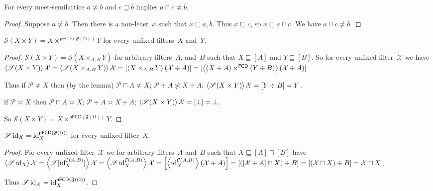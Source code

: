 \begin{lem}
For every meet-semilattice $a\nasymp b$ and
$c\sqsupseteq b$ implies $a\sqcap c\nasymp b$.
\end{lem}

\begin{proof}
Suppose $a\nasymp b$. Then there is a non-least~$x$
such that $x\sqsubseteq a,b$. Thus $x\sqsubseteq c$,
so $x\sqsubseteq a\sqcap c$. We have
$a\sqcap c\nasymp b$.
\end{proof}

\begin{prop}
$\mathscr{S}(X\times Y)
=X\times^{\mathsf{pFCD}(\mathfrak{F}(\mho))}Y$
for every unfixed filters~$X$ and~$Y$.
\end{prop}

\begin{proof}
$\mathscr{S}(X\times Y) = \mathscr{S}(X\times_{A,B}Y)$
for arbitrary filters~$A$, and~$B$ such that
$X\sqsubseteq[A]$ and $Y\sqsubseteq[B]$. So
for every unfixed filter~$\mathcal{X}$ we have
$\left\langle \mathscr{S}(X\times Y)\right\rangle\mathcal{X}=
\left\langle \mathscr{S}(X\times_{A,B}Y)\right\rangle\mathcal{X}=
[\left\langle X\times_{A,B}Y\right\rangle(\mathcal{X}\div A)]=
[\left\langle (X\div A)\times^{\mathsf{FCD}}(Y\div B)\right\rangle
(\mathcal{X}\div A)]$

Thus if $\mathcal{P}\nasymp X$ then
(by the lemma)
$\mathcal{P}\sqcap A\nasymp X$;
$\mathcal{P}\div A\nasymp X\div A$;
$\left\langle \mathscr{S}(X\times Y)\right\rangle\mathcal{X}=
[Y\div B]=Y$.

if $\mathcal{P}\asymp X$ then
$\mathcal{P}\sqcap A\asymp X$;
$\mathcal{P}\div A\asymp X\div A$;
$\left\langle \mathscr{S}(X\times Y)\right\rangle\mathcal{X}=
[\bot]=\bot$.

So $\mathscr{S}(X\times Y)
=X\times^{\mathsf{pFCD}(\mathfrak{F}(\mho))}Y$.
\end{proof}

\begin{prop}
$\mathscr{S}\operatorname{id}_X=
\operatorname{id}^{\mathsf{pFCD}(\mathfrak{F}(\mho))}_{X}$
for every unfixed filter~$X$.
\end{prop}

\begin{proof}
For every unfixed filter~$\mathcal{X}$ we
for arbitrary filters~$A$ and~$B$ such that
$X\sqsubseteq[A]\sqcap[B]$
have
$\left\langle \mathscr{S}\operatorname{id}_X\right\rangle\mathcal{X}=
\left\langle \mathscr{S}[\operatorname{id}^{\mathcal{C}(A,B)}_X]\right\rangle\mathcal{X}=
\left\langle \mathscr{S}\operatorname{id}^{\mathcal{C}(A,B)}_X\right\rangle
\mathcal{X}=
\left[\left\langle \operatorname{id}^{\mathcal{C}(A,B)}_X\right\rangle
(\mathcal{X}\div A)\right]=
[([\mathcal{X}\div A]\sqcap X)\div B]=
[(\mathcal{X}\sqcap X)\div B]=
\mathcal{X}\sqcap X$.

Thus $\mathscr{S}\operatorname{id}_X=
\operatorname{id}^{\mathsf{pFCD}(\mathfrak{F}(\mho))}_{X}$.
\end{proof}

